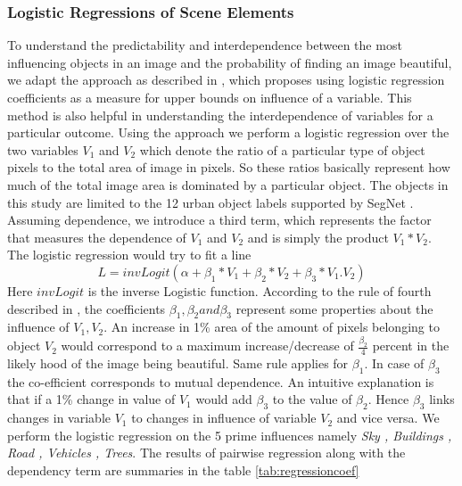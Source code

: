 \subsubsection{Logistic Regressions of Scene Elements}

To understand the predictability and interdependence between the most influencing objects in an image and the probability of finding an image beautiful, we adapt the approach as described in \cite{vaughn2008data},
which proposes using logistic regression coefficients as a measure for upper bounds on influence of a variable. This method is also helpful in understanding the interdependence of variables for a particular outcome. 
Using the approach we perform a logistic regression over the two variables $V_1$ and $V_2$ which denote the ratio of a particular type of object pixels to the total area of image in pixels. So these ratios basically represent how much of the total image area is dominated by a particular object. The objects in this study are limited to the 12 urban object labels supported by SegNet \cite{badrinarayanan2015segnet}.
Assuming dependence, we introduce  a third term, which represents the factor that measures the dependence of $V_1$ and $V_2$ and is simply the product $V_1 * V_2 $.
The logistic regression would try to fit a line 
\begin{equation}
L = invLogit(\alpha + \beta_1 * V_1 + \beta_2 * V_2  + \beta_3 * V_{1}.V_{2} )
\label{eq:regression} 
\end{equation}
Here $invLogit$ is the inverse Logistic function. According to the rule of fourth described in \cite{vaughn2008data} , the coefficients $ \beta_1, \beta_2 and \beta_3 $ represent some properties about the influence of $ V_1, V_2 $. An increase in 1\% area of the amount of pixels belonging to object $ V_2 $ would correspond to a maximum increase/decrease of $\frac{\beta_2}{4}$ percent in the likely hood of the image being beautiful. Same rule applies for $\beta_1$. In case of $\beta_3$ the co-efficient corresponds to mutual dependence. An intuitive explanation is that if a 1\% change in value of $V_1$ would add $\beta_3$ to the value of $\beta_2$. Hence $\beta_3$ links changes in variable $V_1$ to changes in influence of variable $V_2$ and vice versa.
We perform the logistic regression on the 5 prime influences namely \textit{Sky , Buildings , Road , Vehicles , Trees}. The results of pairwise regression along with the dependency term are summaries in the table \ref{tab:regressioncoef}
